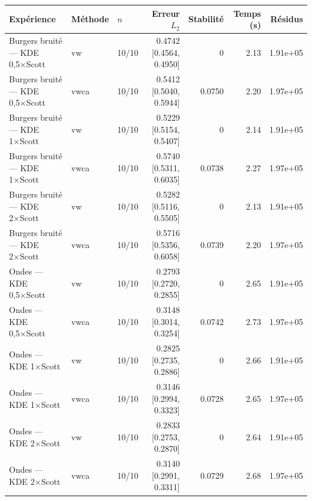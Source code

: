 \begin{tabular}{lllrrrr}
\toprule
Expérience & Méthode & $n$ & Erreur $L_2$ & Stabilité & Temps (s) & Résidus \\
\midrule
Burgers bruité — KDE 0,5×Scott & vw & 10/10 & 0.4742 [0.4564, 0.4950] & 0 & 2.13 & 1.91e+05 \\
Burgers bruité — KDE 0,5×Scott & vwca & 10/10 & 0.5412 [0.5040, 0.5944] & 0.0750 & 2.20 & 1.97e+05 \\
Burgers bruité — KDE 1×Scott & vw & 10/10 & 0.5229 [0.5154, 0.5407] & 0 & 2.14 & 1.91e+05 \\
Burgers bruité — KDE 1×Scott & vwca & 10/10 & 0.5740 [0.5311, 0.6035] & 0.0738 & 2.27 & 1.97e+05 \\
Burgers bruité — KDE 2×Scott & vw & 10/10 & 0.5282 [0.5116, 0.5505] & 0 & 2.13 & 1.91e+05 \\
Burgers bruité — KDE 2×Scott & vwca & 10/10 & 0.5716 [0.5356, 0.6058] & 0.0739 & 2.20 & 1.97e+05 \\
Ondes — KDE 0,5×Scott & vw & 10/10 & 0.2793 [0.2720, 0.2855] & 0 & 2.65 & 1.91e+05 \\
Ondes — KDE 0,5×Scott & vwca & 10/10 & 0.3148 [0.3014, 0.3254] & 0.0742 & 2.73 & 1.97e+05 \\
Ondes — KDE 1×Scott & vw & 10/10 & 0.2825 [0.2735, 0.2886] & 0 & 2.66 & 1.91e+05 \\
Ondes — KDE 1×Scott & vwca & 10/10 & 0.3146 [0.2994, 0.3323] & 0.0728 & 2.65 & 1.97e+05 \\
Ondes — KDE 2×Scott & vw & 10/10 & 0.2833 [0.2753, 0.2870] & 0 & 2.64 & 1.91e+05 \\
Ondes — KDE 2×Scott & vwca & 10/10 & 0.3140 [0.2991, 0.3311] & 0.0729 & 2.68 & 1.97e+05 \\
\bottomrule
\end{tabular}
